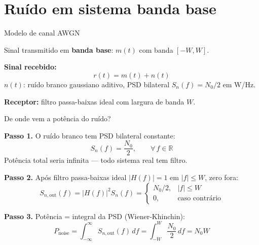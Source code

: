 
\section{Ruído em sistema banda base}

\begin{frame}{Modelo de canal AWGN}

Sinal transmitido em \textbf{banda base}: $m(t)$ com banda $[-W, W]$.

\textbf{Sinal recebido:}
\[
r(t) = m(t) + n(t)
\]
$n(t)$: ruído branco gaussiano aditivo, PSD bilateral $S_n(f) = N_0/2$ em W/Hz.

\vspace{0.3cm}

\textbf{Receptor:} filtro passa-baixas ideal com largura de banda $W$.

\vspace{0.3cm}

\begin{center}
\end{center}

\end{frame}


\begin{frame}{De onde vem a potência do ruído?}

\textbf{Passo 1.} O ruído branco tem PSD bilateral constante:
\[
S_n(f) = \frac{N_0}{2}, \qquad \forall\, f \in \mathbb{R}
\]
Potência total seria infinita — todo sistema real tem filtro.

\textbf{Passo 2.} Após filtro passa-baixas ideal $|H(f)| = 1$ em $|f| \le W$, zero fora:
\[
S_{n,\text{out}}(f) = |H(f)|^2 S_n(f) = \begin{cases} N_0/2, & |f| \le W \\ 0, & \text{caso contrário} \end{cases}
\]

\textbf{Passo 3.} Potência = integral da PSD (Wiener-Khinchin):
\[
P_{\text{noise}} = \int_{-\infty}^{\infty} S_{n,\text{out}}(f)\, df = \int_{-W}^{W} \frac{N_0}{2}\, df = N_0 W
\]

\end{frame}

